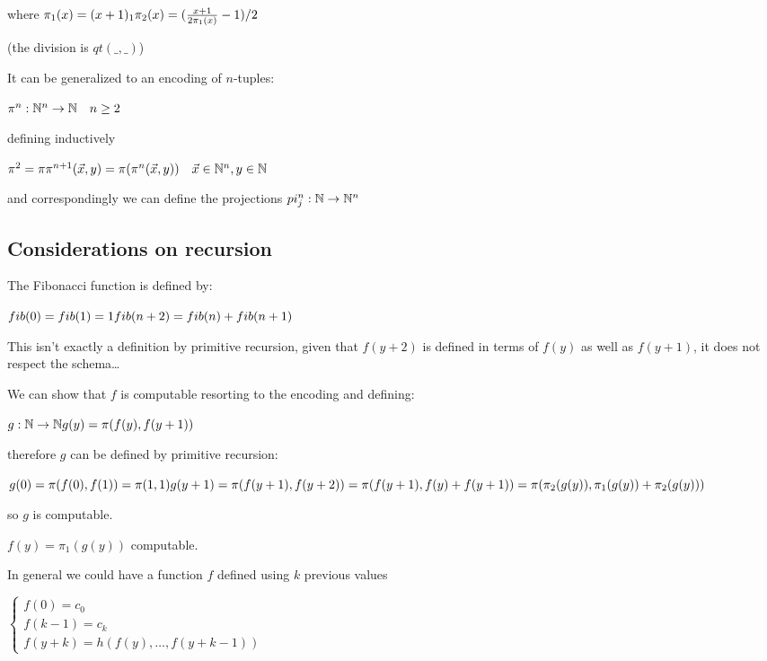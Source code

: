 where $\pi_1(x) = (x+1)_1\\
\pi_2(x) = (\frac{x+1}{2\pi_1(x)}-1)/2$

(the division is $qt(\_,\_)$)

It can be generalized to an encoding of $n$-tuples:

$\pi^n: \mathbb{N}^n\rightarrow\mathbb{N} \quad n\geq2$

defining inductively

$\pi^2 = \pi\\
\\
\pi^{n+1}(\vec{x},y) = \pi(\pi^n(\vec{x},y)) \quad \vec{x} \in \mathbb{N}^n, y \in \mathbb{N}$

and correspondingly we can define the projections $pi_j^n:\mathbb{N}\rightarrow\mathbb{N}^n$

\subsection{Considerations on recursion}

The Fibonacci function is defined by:

$ fib(0) = fib(1) = 1\\
\\
fib(n+2) = fib(n) + fib(n+1) $

This isn't exactly a definition by primitive recursion, given that $f(y+2)$ is defined in terms of $f(y)$ as well as $f(y+1)$, it does not respect the schema\dots

We can show that $f$ is computable resorting to the encoding and defining:

$g:\mathbb{N}\rightarrow\mathbb{N}\\
g(y) = \pi(f(y),f(y+1))$

therefore $g$ can be defined by primitive recursion:

$g(0) = \pi(f(0),f(1)) = \pi(1,1)\\
g(y+1) = \pi(f(y+1),f(y+2)) = \pi(f(y+1),f(y)+f(y+1))\\
= \pi(\pi_2(g(y)), \pi_1(g(y)) + \pi_2(g(y)))$

so $g$ is computable.

$f(y) = \pi_1(g(y))$ computable.

In general we could have a function $f$ defined using $k$ previous values

$\begin{cases}
  f(0) = c_0   \\
  f(k-1) = c_k \\
  f(y+k) = h(f(y),\dots,f(y+k-1))
\end{cases}$

